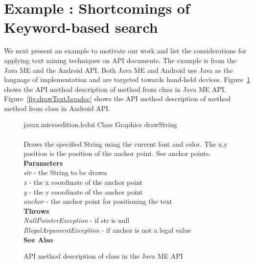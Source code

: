 \section{Example : Shortcomings of Keyword-based search}
\label{sec:example}

We next present an example to motivate our work and list the considerations for applying text mining techniques on API documents. 
The example is from the Java ME and the Android API. Both Java ME and Android use Java as the language of implementation and are targeted towards hand-held devices.
Figure~\ref{fig:drawStringJavadoc} shows the API method description
of  method from
 class in Java ME API.
Figure~\ref{fig:drawTextJavadoc} shows the API method description
of method  method from
 class in Android API.

\begin{figure}
	\begin{framed}
		\begin{small}
			{\small javax.microedition.lcdui} {\normalsize Class Graphics} {\large drawString}\\
			\\
			Draws the specified String using the current font and color. The x,y position is the position of the anchor point. See anchor points.\\
			\textbf{Parameters}\\
			\textit{str} - the String to be drawn\\
			\textit{x} - the x coordinate of the anchor point\\
			\textit{y} - the y coordinate of the anchor point\\
			\textit{anchor} - the anchor point for positioning the text\\
			\textbf{Throws}\\
			\textit{NullPointerException} - if str is null\\
			\textit{IllegalArgumentException} - if anchor is not a legal value\\
			\textbf{See Also}\\
		\end{small}
	\end{framed}
	\caption{ API method description of  class in the Java ME API}
	\label{fig:drawStringJavadoc}
\end{figure}


